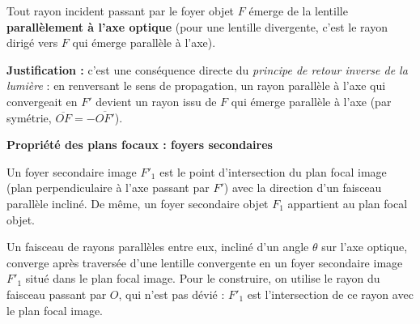 \documentclass[11pt]{article}
\newcommand{\cle}[1]{{\popxbold\color{popdark}#1}}
\begin{document}
\begin{propriete}
Tout rayon incident passant par le \cle{foyer objet} $F$ émerge de la lentille \textbf{parallèlement à l'axe optique} (pour une lentille divergente, c'est le rayon dirigé vers $F$ qui émerge parallèle à l'axe).
\end{propriete}

\textbf{Justification :} c'est une conséquence directe du \emph{principe de retour inverse de la lumière} : en renversant le sens de propagation, un rayon parallèle à l'axe qui convergeait en $F'$ devient un rayon issu de $F$ qui émerge parallèle à l'axe (par symétrie, $\overline{OF} = -\overline{OF'}$).

\textbf{Propriété des plans focaux : foyers secondaires}\par

\begin{definition}
Un \cle{foyer secondaire image} $F'_1$ est le point d'intersection du \cle{plan focal image} (plan perpendiculaire à l'axe passant par $F'$) avec la direction d'un faisceau parallèle incliné. De même, un foyer secondaire objet $F_1$ appartient au plan focal objet.
\end{definition}

\begin{propriete}
Un faisceau de rayons parallèles entre eux, incliné d'un angle $\theta$ sur l'axe optique, converge après traversée d'une lentille convergente en un foyer secondaire image $F'_1$ situé dans le plan focal image. Pour le construire, on utilise le rayon du faisceau passant par $O$, qui n'est pas dévié : $F'_1$ est l'intersection de ce rayon avec le plan focal image.
\end{propriete}
\end{document}
